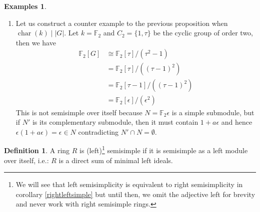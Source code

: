 \documentclass{tufte-handout} %
\theoremstyle{definition}
\newtheorem{defn}[thm]{Definition}
\newtheorem{exmps}[thm]{Examples}
\theoremstyle{remark}
\newcommand{\F}{\mathbb{F}}
\DeclareMathOperator{\im}{Im}
\DeclareMathOperator{\Char}{char}
\begin{document}
\begin{exmps}
\begin{enumerate}
\begin{proof}
			Since $N$ and $M$ are $k$-vector spaces, we know that there is a projection $\pi: M\rightarrow N$ (idempotent and surjective). Observe that $\ker \pi$ is the complement of $N$ as a $k$-vector space, but it is not necessarily a $k[G]$-module. Define the following $k[G]$-module homomorphism\footnote{It is clearly a homomorphism because it is the sum of compositions of homomorphisms. Also, notice that $\frac{1}{|G|}$ is only well-defined when $\Char(k) \nmid |G|$, hence the assumption in the statement.} \[\widetilde{\pi} = \frac{1}{|G|}\sum_{g \in G} g\circ \pi \circ g^{-1} \text{, where $g$ is the (left) multiplication map by $g$.}\]
			We claim that $\im(\widetilde{\pi}) = N$. $\subseteq$ is trivial because $\pi$ always projects onto $N$ and $\supseteq$ is clear because $\widetilde{\pi}$ is the identity on $N$. We conclude that $N' = \ker \widetilde{\pi}$ is the complementary $k[G]$-submodule to $N$. %
		\end{proof}
	\item Let us construct a counter example to the previous proposition when $\Char(k) \mid |G|$. Let $k = \F_2$ and $C_2 = \{1, \tau\}$ be the cyclic group of order two, then we have 
	\begin{align*}
		\F_2[G] &\cong \F_2[\tau]/(\tau^2-1)\\
		&= \F_2[\tau]/((\tau-1)^2)\\
		&= \F_2[\tau-1]/((\tau-1)^2)\\
		&= \F_2[\epsilon]/(\epsilon^2)
	\end{align*}
	This is not semisimple over itself because $N = \F_2\epsilon$ is a simple submodule, but if $N'$ is its complementary submodule, then  it must contain $1+a\epsilon$ and hence $\epsilon(1+a\epsilon) = \epsilon \in N$ contradicting $N' \cap N = \emptyset$.
	\end{enumerate}
\end{exmps}
\begin{defn}
	A ring $R$ is (left)\footnote{We will see that left semisimplicity is equivalent to right semisimplicity in corollary \ref{rightleftsimple} but until then, we omit the adjective left for brevity and never work with right semisimple rings.} semisimple if it is semisimple as a left module over itself, i.e.: $R$ is a direct sum of minimal left ideals.
\end{defn}
\end{document}
